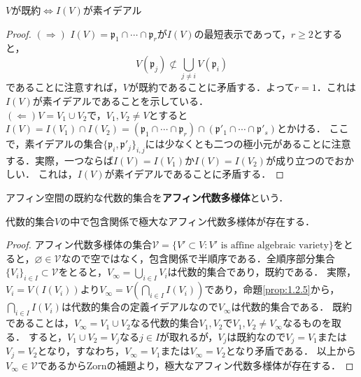 \documentclass{myclass}
\begin{document}
\begin{proposition}\label{prop:1.3.2}
  $V$が既約$\Leftrightarrow$$I(V)$が素イデアル
\end{proposition}
\begin{proof}
  $(\Rightarrow)$
  $I(V) = \mathfrak{p}_1\cap \cdots \cap \mathfrak{p}_r$が$I(V)$の最短表示であって，$r\geq 2$とすると，
  \begin{equation*}
    V(\mathfrak{p}_j) \not \subset \bigcup_{j\neq i}V(\mathfrak{p}_i)
  \end{equation*}
  であることに注意すれば，$V$が既約であることに矛盾する．よって$r=1$．これは$I(V)$が素イデアルであることを示している．\\
  $(\Leftarrow)$$V=V_1\cup V_2$で，$V_1,V_2\neq V$とすると$I(V) = I(V_1)\cap I(V_2) = (\mathfrak{p}_1\cap \cdots \cap \mathfrak{p}_r)\cap (\mathfrak{p}'_1 \cap \cdots \cap \mathfrak{p}'_s)$とかける．
  ここで，素イデアルの集合$\{\mathfrak{p}_i,\mathfrak{p}'_j\}_{i,j}$には少なくとも二つの極小元があることに注意する．実際，一つならば$I(V) = I(V_1)$か$I(V) = I(V_2)$が成り立つのでおかしい．
  これは，$I(V)$が素イデアルであることに矛盾する．
\end{proof}

\begin{definition}
  アフィン空間の既約な代数的集合を\textbf{アフィン代数多様体}という．
\end{definition}

\begin{proposition}
  代数的集合$V$の中で包含関係で極大なアフィン代数多様体が存在する．
\end{proposition}
\begin{proof}
  アフィン代数多様体の集合$\mathcal{V} = \{V' \subset V : V'  \text{ is affine algebraic variety}\}$をとると，$\varnothing \in \mathcal{V}$なので空ではなく，包含関係で半順序である．全順序部分集合$\{V_i\}_{i\in I}\subset \mathcal{V}$をとると，$V_{\infty} = \bigcup_{i\in I} V_i$は代数的集合であり，既約である．
  実際，$V_{i} = V(I(V_{i}))$より$V_{\infty} = V(\bigcap_{i\in I}I(V_i))$であり，命題\ref{prop:1.2.5}から，$\bigcap_{i\in I}I(V_i)$は代数的集合の定義イデアルなので$V_{\infty}$は代数的集合である．
  既約であることは，$V_{\infty} = V_1 \cup V_2$なる代数的集合$V_1,V_2$で$V_1,V_2\neq V_{\infty}$なるものを取る．
  すると，$V_1\cup V_2 = V_{j}$なる$j\in I$が取れるが，$V_j$は既約なので$V_j = V_1$または$V_j = V_2$となり，すなわち，$V_{\infty} = V_1$または$V_{\infty} = V_2$となり矛盾である．
  以上から$V_{\infty}\in \mathcal{V}$であるからZornの補題より，極大なアフィン代数多様体が存在する．
\end{proof}
\end{document}
